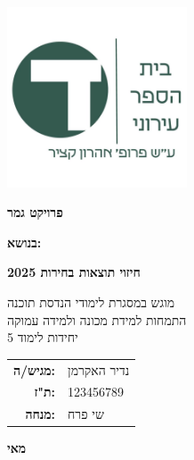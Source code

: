\documentclass[11pt]{article}
\begin{document}
\begin{titlepage}
\begin{center}

\includegraphics[width=0.4\textwidth]{school-logo}

\vspace{2cm}

{\Huge\textbf{פרויקט גמר}}

\vspace{1cm}

{\LARGE\textbf{בנושא:}}

\vspace{0.5cm}

{\LARGE\textbf{\textcolor{schoolgreen}{חיזוי תוצאות בחירות 2025}}}

\vspace{2cm}

{\Large
מוגש במסגרת לימודי הנדסת תוכנה\\
התמחות למידת מכונה ולמידה עמוקה\\
5 יחידות לימוד
}

\vspace{2cm}

\begin{Large}
\begin{tabular}{r@{}l}
\textbf{מגיש/ה:} & \hspace{2cm} נדיר האקרמן\\[0.3cm]
\textbf{ת"ז:} & \hspace{2cm} 123456789\\[0.3cm]
\textbf{מנחה:} & \hspace{2cm} שי פרח
\end{tabular}
\end{Large}

\vfill

{\Large \textbf{מאי }}

\end{center}
\end{titlepage}
\end{document}
